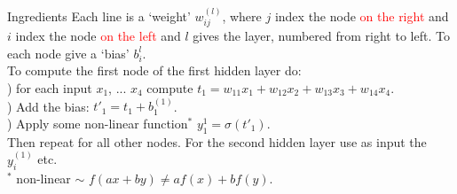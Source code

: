 \documentclass[10pt]{beamer}
\newcommand{\red}[1]{\textcolor{red}{#1}}
\renewcommand{\[}{\begin{equation*}}
\renewcommand{\]}{\end{equation*}}
\begin{document}
\begin{frame}{Ingredients}
Each line is a `weight' $w^{(l)}_{ij}$, where $j$ index the node \red{on the right} and $i$ index the node \red{on the left} and $l$ gives the layer, numbered from right to left. To each node give a `bias' $b^{l}_i$.\\
To compute the first node of the first hidden layer do:\\
) for each input $x_1$, ... $x_4$ compute $t_1 = w_{11}x_1+w_{12}x_2+w_{13}x_3+w_{14}x_4$.\\
) Add the bias: $t'_1 = t_1 + b^{(1)}_1 $.\\
) Apply some non-linear function$^*$ $y^{1}_1 = \sigma(t'_1)$.\\
\pause
Then repeat for all other nodes. For the second hidden layer use as input the $y^(1)_i$ etc.\\

$^*$ non-linear $\sim$ $f(a x+ by)\neq af(x)+bf(y)$.
\end{frame}
\end{document}

